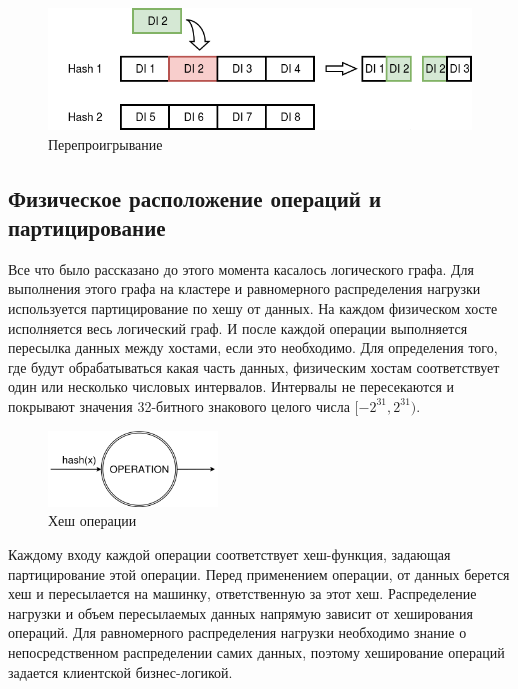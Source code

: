\documentclass[14pt]{matmex-diploma-custom}
\begin{document}
\begin{figure}
  \centering
	\includegraphics[width=1.0\textwidth]{pics/invalid.png}
	\caption{Перепроигрывание}
\end{figure}

\subsection{Физическое расположение операций и партицирование}

Все что было рассказано до этого момента касалось логического графа. Для выполнения этого графа на кластере и равномерного распределения нагрузки используется партицирование по хешу от данных. На каждом физическом хосте исполняется весь логический граф. И после каждой операции выполняется пересылка данных между хостами, если это необходимо. Для определения того, где будут обрабатываться какая часть данных, физическим хостам соответствует один или несколько числовых интервалов. Интервалы не пересекаются и покрывают значения 32-битного знакового целого числа \([-2^{31}, 2^{31})\).

\begin{figure}
  \centering
	\includegraphics[width=0.4\textwidth]{pics/ophash.png}
	\caption{Хеш операции}
\end{figure}

Каждому входу каждой операции соответствует хеш-функция, задающая партицирование этой операции. Перед применением операции, от данных берется хеш и пересылается на машинку, ответственную за этот хеш. Распределение нагрузки и объем пересылаемых данных напрямую зависит от хеширования операций. Для равномерного распределения нагрузки необходимо знание о непосредственном распределении самих данных, поэтому хеширование операций задается клиентской бизнес-логикой.
\end{document}
